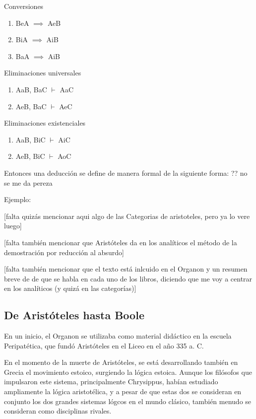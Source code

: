 \documentclass{article}
\begin{document}
Conversiones

\begin{enumerate}
    \item BeA $\implies$ AeB
    \item BiA $\implies$ AiB
    \item BaA $\implies$ AiB
\end{enumerate}

Eliminaciones universales

\begin{enumerate}
    \item AaB, BaC $\vdash$ AaC
    \item AeB, BaC $\vdash$ AeC
\end{enumerate}

Eliminaciones existenciales

\begin{enumerate}
    \item AaB, BiC $\vdash$ AiC
    \item AeB, BiC $\vdash$ AoC
\end{enumerate}

Entonces una deducción se define de manera formal de la siguiente forma: ?? no se me da pereza

Ejemplo:

\cite{corcoran2009aristotle,smith1989prior}

[falta quizás mencionar aqui algo de las Categorias de aristoteles, pero ya lo vere luego]

[falta también mencionar que Aristóteles da en los analíticos el método de la demostración por reducción al absurdo]

[falta también mencionar que el texto está inlcuido en el Organon y un resumen breve de de que se habla en cada uno de los libros, diciendo que me voy a centrar en los analíticos (y quizá en las categorías)]

\subsection{De Aristóteles hasta Boole}

En un inicio, el Organon se utilizaba como material didáctico en la escuela Peripatética, que fundó Aristóteles en el Liceo en el año 335 a. C.

En el momento de la muerte de Aristóteles, se está desarrollando también en Grecia el movimiento estoico, surgiendo la lógica estoica. Aunque los filósofos que impulsaron este sistema, principalmente Chrysippus, habían estudiado ampliamente la lógica aristotélica, y a pesar de que estas dos se consideran en conjunto los dos grandes sistemas lógcos en el mundo clásico, también menudo se consideran como disciplinas rivales.
\end{document}
